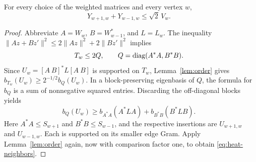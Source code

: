 \begin{lemma}\label{lem:neighbors}
For every choice of the weighted matrices and every vertex $w$,
\begin{equation}\label{eq:heat-neighbors}
 Y_{w+1,w}+Y_{w-1,w}\le\sqrt2\,V_w.
\end{equation}
\end{lemma}
\begin{proof}
Abbreviate $A=W_w$, $B=W_{w-1}^*$, and $L=L_w$.  The inequality
$\lVert Az+Bz'\rVert^2\le2\lVert Az\rVert^2+2\lVert Bz'\rVert^2$
implies
\[
 T_w\le2Q,\qquad Q=\operatorname{diag}(A^*A,B^*B).
\]
Since $U_w=[A\ B]^*L[A\ B]$ is supported on $T_w$,
Lemma~\ref{lem:order} gives $b_{T_w}(U_w)\ge2^{-1/2}b_Q(U_w)$.
In a block-preserving eigenbasis of $Q$, the formula for $b_Q$ is a sum
of nonnegative squared entries.  Discarding the off-diagonal blocks yields
\[
 b_Q(U_w)\ge b_{A^*A}(A^*LA)+b_{B^*B}(B^*LB).
\]
Here $A^*A\le S_{w+1}$ and $B^*B\le S_{w-1}$, and the respective
insertions are $U_{w+1,w}$ and $U_{w-1,w}$.  Each is supported on its
smaller edge Gram.  Apply Lemma~\ref{lem:order} again, now with comparison
factor one, to obtain \eqref{eq:heat-neighbors}.
\end{proof}

